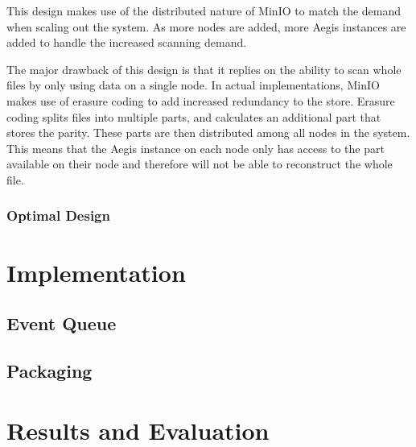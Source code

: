 \documentclass[12pt, conference, final, a4paper, onecolumn, compsoc]{IEEEtran}
\begin{document}
    This design makes use of the distributed nature of MinIO to match the demand
    when scaling out the system. As more nodes are added, more Aegis instances
    are added to handle the increased scanning demand.




    The major drawback of this design is that it replies on the ability to scan
    whole files by only using data on a single node. In actual implementations,
    MinIO makes use of erasure coding to add increased redundancy to the store.
    Erasure coding splits files into multiple parts, and calculates an
    additional part that stores the parity. These parts are then distributed
    among all nodes in the system. This means that the Aegis instance on each
    node only has access to the part available on their node and therefore will
    not be able to reconstruct the whole file.

    \subsubsection*{Optimal Design}


    \section{Implementation}
    \subsection*{Event Queue}

    \subsection*{Packaging}

    \section{Results and Evaluation}
    \subsection*{}
\end{document}
